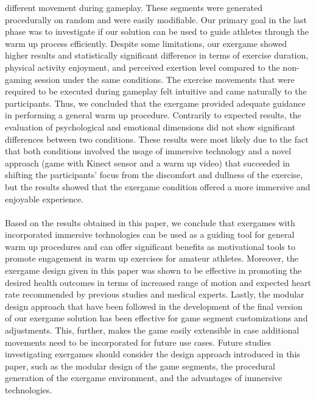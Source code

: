 different movement during gameplay. These segments were generated procedurally on random and were easily modifiable. Our primary goal in the last phase was to investigate if our solution can be used to guide athletes through the warm up process efficiently. Despite some limitations, our exergame showed higher results and statistically significant difference in terms of exercise duration, physical activity enjoyment, and perceived exertion level compared to the non-gaming session under the same conditions. The exercise movements that were required to be executed during gameplay felt intuitive and came naturally to the participants. Thus, we concluded that the exergame provided adequate guidance in performing a general warm up procedure. Contrarily to expected results, the evaluation of psychological and emotional dimensions  did not show significant differences between two conditions. These results were most likely due to the fact that both conditions involved the usage of immersive technology and a novel approach (game with Kinect sensor and a warm up video) that succeeded in shifting the participants' focus from the discomfort and dullness of the exercise, but the results showed that the exergame condition offered a more immersive and enjoyable experience.\\\\
Based on the results obtained in this paper, we conclude that exergames with incorporated immersive technologies can be used  as a guiding tool for general warm up procedures and can offer significant benefits as motivational tools to promote engagement in warm up exercises for amateur athletes. Moreover, the exergame design given in this paper was shown to be effective in promoting the desired health outcomes in terms of increased range of motion and expected heart rate recommended by previous studies and medical experts.  Lastly, the modular design approach that have been followed in the development of the final version of our exergame solution has been effective for game segment customizations and adjustments. This, further, makes the game easily extensible in case additional movements need to be incorporated for future use cases. Future studies investigating exergames should consider the design approach introduced in this paper, such as the modular design of the game segments, the procedural generation of the exergame environment, and the advantages of immersive technologies.\pagebreak
